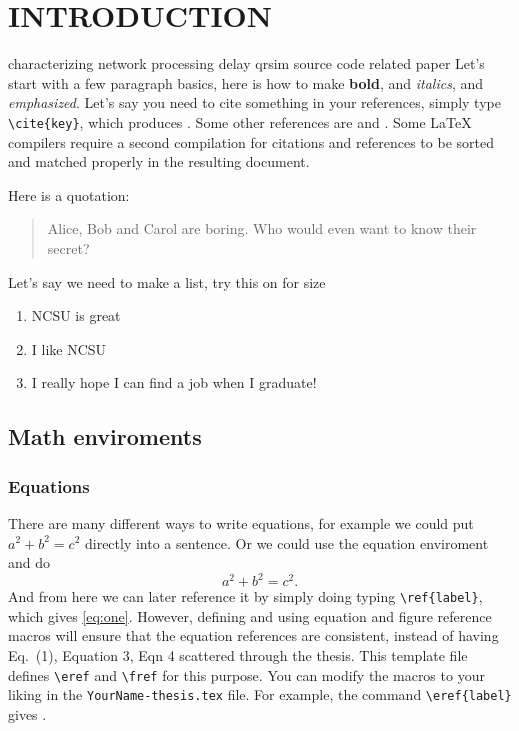 \chapter{INTRODUCTION}
\label{chap-one}
characterizing network processing delay \cite{1378257}
qrsim source code \cite{qrsim_github} related paper \cite{denardi2013rn}
Let's start with a few paragraph basics, here is how to make \textbf{bold}, 
and \textit{italics}, and \emph{emphasized}.  Let's say you need to cite 
something in your references, simply type \verb^\cite{key}^, which produces
\cite{einstein1935particle}.  
Some other references are \cite{golub1996matrix} and 
\cite{larsen1974asymptotic}.
Some \LaTeX{} compilers 
require a second compilation for citations and references 
to be sorted and matched properly in the resulting document.  

Here is a quotation:
\begin{quotation}
Alice, Bob and Carol are boring.  Who would even want to know their secret?
\end{quotation}

Let's say we need to make a list, try this on for size
\begin{enumerate}
  \item NCSU is great
  \item I like NCSU
  \item I really hope I can find a job when I graduate!
\end{enumerate} 

\section{Math enviroments}
\subsection{Equations}

There are many different ways to write equations, for example we could put 
$a^2 + b^2 = c^2$ directly into a sentence.  Or we could use the equation 
enviroment and do 
%
\begin{equation}
  a^2+b^2=c^2.
  \label{eq:one}
\end{equation} 
And from here we can later reference it by simply doing typing 
\verb^\ref{label}^, which gives \ref{eq:one}.  However, defining and using
equation and figure reference macros will ensure that the equation
references are consistent, instead of having Eq.~(1), Equation 3, Eqn 4
scattered through the thesis.  This template file defines \verb^\eref^
and \verb^\fref^ for this purpose. You can modify the macros to your liking
in the \texttt{YourName-thesis.tex} file.
For example, the command \verb^\eref{label}^ gives .


